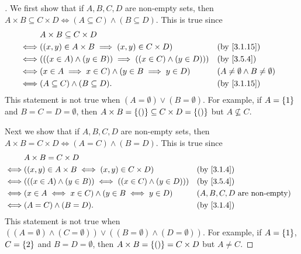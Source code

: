 \begin{proof}[]
	We first show that if \(A, B, C, D\) are non-empty sets, then \(A \times B \subseteq C \times D \iff (A \subseteq C) \land (B \subseteq D)\).
	This is true since
	\begin{align*}
		     & A \times B \subseteq C \times D                                                                                      \\
		\iff & \pa{(x, y) \in A \times B \implies (x, y) \in C \times D}             &  & \by{3.1.15}                               \\
		\iff & \pa{((x \in A) \land (y \in B)) \implies ((x \in C) \land (y \in D))} &  & \by{3.5.4}                                \\
		\iff & \pa{x \in A \implies x \in C} \land \pa{y \in B \implies y \in D}     &  & (A \neq \emptyset \land B \neq \emptyset) \\
		\iff & (A \subseteq C) \land (B \subseteq D).                                &  & \by{3.1.15}
	\end{align*}
	This statement is not true when \((A = \emptyset) \lor (B = \emptyset)\).
	For example, if \(A = \left\lbrace1\right\rbrace\) and \(B = C = D = \emptyset\), then \(A \times B = \left\lbrace()\right\rbrace \subseteq C \times D = \left\lbrace()\right\rbrace\) but \(A \not \subseteq C\).

	Next we show that if \(A, B, C, D\) are non-empty sets, then \(A \times B = C \times D \iff (A = C) \land (B = D)\).
	This is true since
	\begin{align*}
		     & A \times B = C \times D                                                                                      \\
		\iff & \pa{(x, y) \in A \times B \iff (x, y) \in C \times D}             &  & \by{3.1.4}                            \\
		\iff & \pa{((x \in A) \land (y \in B)) \iff ((x \in C) \land (y \in D))} &  & \by{3.5.4}                            \\
		\iff & (x \in A \iff x \in C) \land (y \in B \iff y \in D)               &  & \text{(\(A, B, C, D\) are non-empty)} \\
		\iff & (A = C) \land (B = D).                                            &  & \by{3.1.4}
	\end{align*}
	This statement is not true when \(((A = \emptyset) \land (C = \emptyset)) \lor ((B = \emptyset) \land (D = \emptyset))\).
	For example, if \(A = \left\lbrace1\right\rbrace\), \(C = \left\lbrace2\right\rbrace\) and \(B = D = \emptyset\), then \(A \times B = \left\lbrace()\right\rbrace = C \times D\) but \(A \neq C\).
\end{proof}

